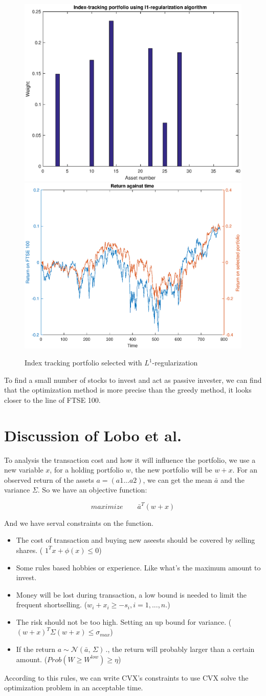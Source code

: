 \documentclass[a4paper, 12pt]{article}
\begin{document}
	\begin{figure}
		\begin{center}
       		\includegraphics[width=0.45\linewidth]{stock_price/q3_b_1.eps}
       		\includegraphics[width=0.45\linewidth]{stock_price/q3_b_2.eps}
		\end{center}
		\caption{Index tracking portfolio selected with $L^1$-regularization}
   		\label{fig:q3_b}
	\end{figure}
	 
	 To find a small number of stocks to invest and act as passive invester, we can find that the optimization method is more precise than the greedy method, it looks closer to the line of FTSE 100. 
	
	\section{Discussion of Lobo et al.}
	To analysis the transaction cost and how it will influence the portfolio, we use a new variable $x$, for a holding portfolio $w$, the new portfolio will be $w+x$. For an observed return of the assets $a=(a1 ... a2)$, we can get the mean $\bar{a}$ and the variance $\Sigma$.
	So we have an objective function:
	
	$$ maximize \qquad \bar{a}^T(w+x) $$
	
	And we have serval constraints on the function.

    \begin{itemize}
		\item The cost of transaction and buying new aseests should be covered by selling shares. ( $ 1^Tx+\phi(x)\leq 0$)
		\item Some rules based hobbies or experience. Like what's the maximum amount to invest.
		\item Money will be lost during transaction, a low bound is needed to limit the frequent shortselling. ($w_i+x_i\geq - s_i, i=1,...,n.$)
		\item The risk should not be too high. Setting an up bound for variance. ($(w+x)^T\Sigma(w+x)\leq\sigma_{max}$)
		\item If the return $a \sim \mathcal{N}(\bar{a},\,\Sigma)\,.$, the return will probably larger than a certain amount. ($Prob(W\geq W^{low}) \geq \eta$)
	\end{itemize}
	
	According to this rules, we can write CVX's constraints to use CVX solve the optimization problem in an acceptable time.	
	
	
\end{document}
